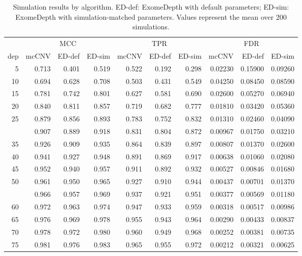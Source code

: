 \documentclass[11pt,letterpaper,oneside]{book}
\begin{document}
\begin{table}

\caption[Algorithm performance comparing mcCNV and ExomeDepth on simulated exomes.]{\label{tab:simResTbl}Simulation results by algorithm. ED-def: ExomeDepth with default parameters; ED-sim: ExomeDepth with simulation-matched parameters. Values represent the mean over 200 simulations.}
\centering
\begin{tabular}[t]{rrrrrrrrrr}
\toprule
\multicolumn{1}{c}{ } & \multicolumn{3}{c}{MCC} & \multicolumn{3}{c}{TPR} & \multicolumn{3}{c}{FDR} \\
\cmidrule(l{3pt}r{3pt}){2-4} \cmidrule(l{3pt}r{3pt}){5-7} \cmidrule(l{3pt}r{3pt}){8-10}
dep & mcCNV & ED-def & ED-sim & mcCNV & ED-def & ED-sim & mcCNV & ED-def & ED-sim\\
\midrule
5 & 0.713 & 0.401 & 0.519 & 0.522 & 0.192 & 0.298 & 0.02230 & 0.15900 & 0.09260\\
10 & 0.694 & 0.628 & 0.708 & 0.503 & 0.431 & 0.549 & 0.04250 & 0.08450 & 0.08590\\
15 & 0.781 & 0.742 & 0.801 & 0.627 & 0.581 & 0.690 & 0.02600 & 0.05270 & 0.06940\\
20 & 0.840 & 0.811 & 0.857 & 0.719 & 0.682 & 0.777 & 0.01810 & 0.03420 & 0.05360\\
25 & 0.879 & 0.856 & 0.893 & 0.783 & 0.752 & 0.832 & 0.01310 & 0.02460 & 0.04090\\
\addlinespace
30 & 0.907 & 0.889 & 0.918 & 0.831 & 0.804 & 0.872 & 0.00967 & 0.01750 & 0.03210\\
35 & 0.926 & 0.909 & 0.935 & 0.864 & 0.839 & 0.897 & 0.00807 & 0.01370 & 0.02600\\
40 & 0.941 & 0.927 & 0.948 & 0.891 & 0.869 & 0.917 & 0.00638 & 0.01060 & 0.02080\\
45 & 0.952 & 0.940 & 0.957 & 0.911 & 0.892 & 0.932 & 0.00527 & 0.00846 & 0.01680\\
50 & 0.961 & 0.950 & 0.965 & 0.927 & 0.910 & 0.944 & 0.00437 & 0.00701 & 0.01370\\
\addlinespace
55 & 0.966 & 0.957 & 0.969 & 0.937 & 0.921 & 0.951 & 0.00377 & 0.00569 & 0.01180\\
60 & 0.972 & 0.963 & 0.974 & 0.947 & 0.933 & 0.959 & 0.00318 & 0.00517 & 0.00986\\
65 & 0.976 & 0.969 & 0.978 & 0.955 & 0.943 & 0.964 & 0.00290 & 0.00433 & 0.00837\\
70 & 0.978 & 0.972 & 0.980 & 0.960 & 0.949 & 0.968 & 0.00252 & 0.00381 & 0.00735\\
75 & 0.981 & 0.976 & 0.983 & 0.965 & 0.955 & 0.972 & 0.00212 & 0.00321 & 0.00625\\

\end{tabular}
\end{table}
\end{document}

